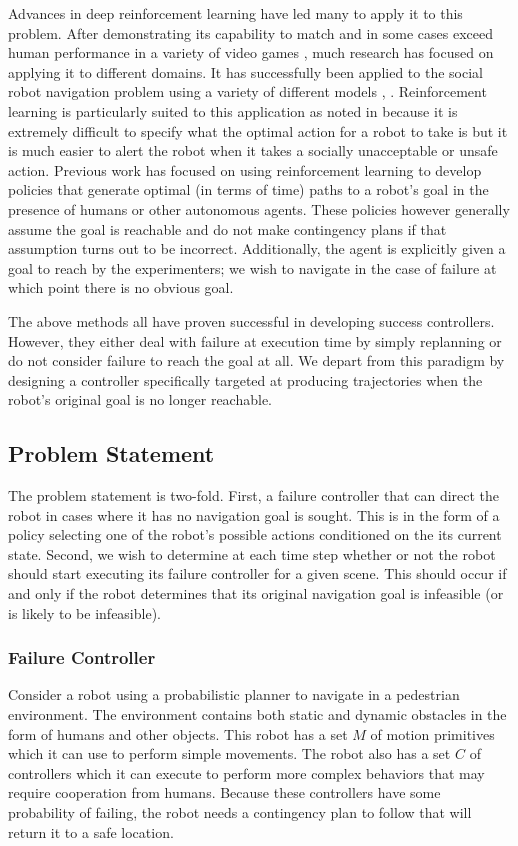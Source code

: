 \documentclass[letterpaper]{article}
\begin{document}
			Advances in deep reinforcement learning have led many to apply it to this problem. After demonstrating its capability to match and in some cases exceed human performance in a variety of video games \cite{atarirl}, much research has focused on applying it to different domains. It has successfully been applied to the social robot navigation problem using a variety of different models \cite{sociallyawarerl}, \cite{crowdawarerl}. Reinforcement learning is particularly suited to this application as noted in \cite{sociallyawarerl} because it is extremely difficult to specify what the optimal action for a robot to take is but it is much easier to alert the robot when it takes a socially unacceptable or unsafe action. Previous work has focused on using reinforcement learning to develop policies that generate optimal (in terms of time) paths to a robot's goal in the presence of humans or other autonomous agents. These policies however generally assume the goal is reachable and do not make contingency plans if that assumption turns out to be incorrect. Additionally, the agent is explicitly given a goal to reach by the experimenters; we wish to navigate in the case of failure at which point there is no obvious goal.
			
			The above methods all have proven successful in developing success controllers. However, they either deal with failure at execution time by simply replanning or do not consider failure to reach the goal at all. We depart from this paradigm by designing a controller specifically targeted at producing trajectories when the robot's original goal is no longer reachable.
		
		\subsection{Problem Statement}
			The problem statement is two-fold. First, a failure controller that can direct the robot in cases where it has no navigation goal is sought. This is in the form of a policy selecting one of the robot's possible actions conditioned on the its current state. Second, we wish to determine at each time step whether or not the robot should start executing its failure controller for a given scene. This should occur if and only if the robot determines that its original navigation goal is infeasible (or is likely to be infeasible).
			
			\subsubsection{Failure Controller}
				Consider a robot using a probabilistic planner to navigate in a pedestrian environment. The environment contains both static and dynamic obstacles in the form of humans and other objects. This robot has a set $M$ of motion primitives which it can use to perform simple movements. The robot also has a set $C$ of controllers which it can execute to perform more complex behaviors that may require cooperation from humans. Because these controllers have some probability of failing, the robot needs a contingency plan to follow that will return it to a safe location. 
				
\end{document}
